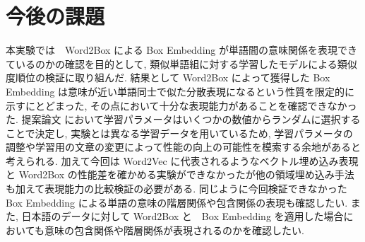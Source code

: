 \documentclass[twocolumn]{jarticle}     %
\begin{document}
\section{今後の課題}
本実験では　Word2Box による Box Embedding が単語間の意味関係を表現できているのかの確認を目的として, 類似単語組に対する学習したモデルによる類似度順位の検証に取り組んだ. 
結果として Word2Box によって獲得した Box Embedding は意味が近い単語同士で似た分散表現になるという性質を限定的に示すにとどまった, その点において十分な表現能力があることを確認できなかった. 
提案論文 \cite{dasgupta-etal-2022-word2box} において学習パラメータはいくつかの数値からランダムに選択することで決定し, 実験とは異なる学習データを用いているため, 学習パラメータの調整や学習用の文章の変更によって性能の向上の可能性を模索する余地があると考えられる. 
加えて今回は Word2Vec に代表されるようなベクトル埋め込み表現と Word2Box の性能差を確かめる実験ができなかったが他の領域埋め込み手法も加えて表現能力の比較検証の必要がある. 
同じように今回検証できなかった Box Embedding による単語の意味の階層関係や包含関係の表現も確認したい. 
また, 日本語のデータに対して Word2Box と　Box Embedding を適用した場合においても意味の包含関係や階層関係が表現されるのかを確認したい. 

\end{document}
